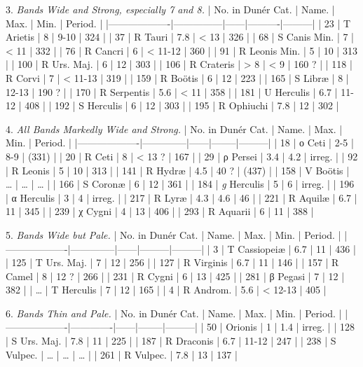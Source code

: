 \documentclass[a4paper, 12pt, oneside, polutonikogreek, english]{article}
\begin{document}
3. \emph{Bands Wide and Strong, especially 7 and 8.} 
| No. in Dunér Cat. | Name.     | Max. | Min.   | Period. |
|-------------------|---------------|------|----------|---------|
| 23        | T Arietis   | 8  | 9-10   | 324   |
| 37        | R Tauri    | 7.8 | < 13   | 326   |
| 68        | S Canis Min. | 7  | < 11   | 332   |
| 76        | R Cancri   | 6  | < 11-12 | 360   |
| 91        | R Leonis Min. | 5  | 10    | 313   |
| 100        | R Urs. Maj.  | 6  | 12    | 303   |
| 106        | R Crateris  | > 8 | < 9   | 160 ?  |
| 118        | R Corvi    | 7  | < 11-13 | 319   |
| 159        | R Boötis   | 6  | 12    | 223   |
| 165        | S Libræ    | 8  | 12-13  | 190 ?  |
| 170        | R Serpentis  | 5.6 | < 11   | 358   |
| 181        | U Herculis  | 6.7 | 11-12  | 408   |
| 192        | S Herculis  | 6  | 12    | 303   |
| 195        | R Ophiuchi  | 7.8 | 12    | 302   |

4. \emph{All Bands Markedly Wide and Strong.} 
| No. in Dunér Cat. | Name.    | Max. | Min.  | Period. |
|-------------------|--------------|------|--------|---------|
| 18        | ο Ceti    | 2-5 | 8-9  | (331)  |
| 20        | R Ceti    | 8  | < 13 ? | 167   |
| 29        | ρ Persei   | 3.4 | 4.2  | irreg. |
| 92        | R Leonis   | 5  | 10   | 313   |
| 141        | R Hydræ   | 4.5 | 40 ?  | (437)  |
| 158        | V Boötis   | …  | …   | …    |
| 166        | S Coronæ   | 6  | 12   | 361   |
| 184        | \emph{g} Herculis | 5  | 6   | irreg. |
| 196        | α Herculis  | 3  | 4   | irreg. |
| 217        | R Lyræ    | 4.3 | 4.6  | 46   |
| 221        | R Aquilæ   | 6.7 | 11   | 345   |
| 239        | χ Cygni   | 4  | 13   | 406   |
| 293        | R Aquarii  | 6  | 11   | 388   |

5. \emph{Bands Wide but Pale.} 
| No. in Dunér Cat. | Name.    | Max. | Min.  | Period. |
|-------------------|--------------|------|---------|---------|
| 3         | T Cassiopeiæ | 6.7 | 11   | 436   |
| 125        | T Urs. Maj. | 7  | 12   | 256   |
| 127        | R Virginis  | 6.7 | 11   | 146   |
| 157        | R Camel   | 8  | 12 ?  | 266   |
| 231        | R Cygni   | 6  | 13   | 425   |
| 281        | β Pegasi   | 7  | 12   | 382   |
| …         | T Herculis  | 7  | 12   | 165   |
| 4         | R Androm.  | 5.6 | < 12-13 | 405   |

6. \emph{Bands Thin and Pale.} 
| No. in Dunér Cat. | Name.    | Max. | Min.  | Period. |
|-------------------|-------------|------|--------|---------|
| 50        | Orionis   | 1  | 1.4  | irreg. |
| 128        | S Urs. Maj. | 7.8 | 11   | 225   |
| 187        | R Draconis | 6.7 | 11-12 | 247   |
| 238        | S Vulpec.  | …  | …   | …    |
| 261        | R Vulpec.  | 7.8 | 13   | 137   |
\end{document}
